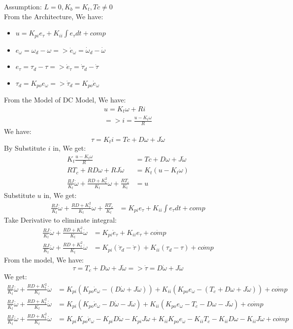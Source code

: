 \documentclass[12pt,a4paper]{article}
\begin{document}
	Assumption: $ L = 0, K_b = K_t, Tc \not= 0$\\
	From the Architecture, We have:
	\begin{itemize}
		\item \(u = K_{pi}e_\tau + K_{ii}\int e_\tau dt + comp\)
		\item \(e_\omega = \omega_d - \omega => \dot{e}_\omega = \dot{\omega}_d - \dot{\omega}\)
		\item \(e_\tau = \tau_d - \tau => \dot{e}_\tau = \dot{\tau}_d - \dot{\tau}\)
		\item \(\tau_d = K_{po}e_\omega => \dot{\tau}_d = K_{po}\dot{e}_\omega\)
	\end{itemize}
	From the Model of DC Model, We have:
	\[
	\begin{split}
		u = K_t\omega + Ri \\
		=> i = \frac{u - K_t\omega}{R}
	\end{split}
	\]
	We have:
	\[
	\tau = K_t i = Tc + D\omega + J\dot{\omega}
	\]
	By Substitute $ i $ in, We get:
	\[
	\begin{split}
		K_t \frac{u - K_t\omega}{R} &= Tc + D\omega + J\dot{\omega} \\
		RT_c + RD\omega + RJ\dot{\omega} &= K_t(u-K_t\omega) \\
		\frac{RJ}{K_t} \dot{\omega} + \frac{RD + K_t^2}{K_t} \omega + \frac{RT_c}{K_t} &= u
	\end{split}
	\]
	Substitute $ u $ in, We get:
	\[
	\begin{split}
		\frac{RJ}{K_t} \dot{\omega} + \frac{RD + K_t^2}{K_t} \omega + \frac{RT_c}{K_t} &= K_{pi}e_\tau + K_{ii}\int e_\tau dt + comp
	\end{split}
	\]
	Take Derivative to eliminate integral:
	\[
	\begin{split}
		\frac{RJ}{K_t} \ddot{\omega} + \frac{RD + K_t^2}{K_t} \dot{\omega} &= K_{pi}\dot{e}_\tau + K_{ii}e_\tau  + \dot{comp}\\
		\frac{RJ}{K_t} \ddot{\omega} + \frac{RD + K_t^2}{K_t} \dot{\omega} &= K_{pi}(\dot{\tau}_d - \dot{\tau}) + K_{ii}(\tau_d - \tau)  + \dot{comp}
	\end{split}
	\]
	From the model, We have:
	\[
	\tau = T_c + D\omega + J\dot{\omega} => \dot{\tau} = D\dot{\omega} + J \ddot{\omega}
	\]
	We get:
	\[
	\begin{split}
		\frac{RJ}{K_t} \ddot{\omega} + \frac{RD + K_t^2}{K_t} \dot{\omega} &= K_{pi}(K_{po}\dot{e}_\omega - (D\dot{\omega} + J \ddot{\omega})) + K_{ii}(K_{po}e_\omega - (T_c + D\omega + J\dot{\omega}))  + \dot{comp} \\	
		\frac{RJ}{K_t} \ddot{\omega} + \frac{RD + K_t^2}{K_t} \dot{\omega} &= K_{pi}(K_{po}\dot{e}_\omega - D\dot{\omega} - J \ddot{\omega}) + K_{ii}(K_{po}e_\omega - T_c - D\omega - J\dot{\omega})  + \dot{comp} \\
		\frac{RJ}{K_t} \ddot{\omega} + \frac{RD + K_t^2}{K_t} \dot{\omega} &= K_{pi}K_{po}\dot{e}_\omega - K_{pi}D\dot{\omega} - K_{pi}J \ddot{\omega} + K_{ii}K_{po}e_\omega - K_{ii}T_c - K_{ii}D\omega - K_{ii}J\dot{\omega}  + \dot{comp} \\
	\end{split}
	\]
\end{document}
